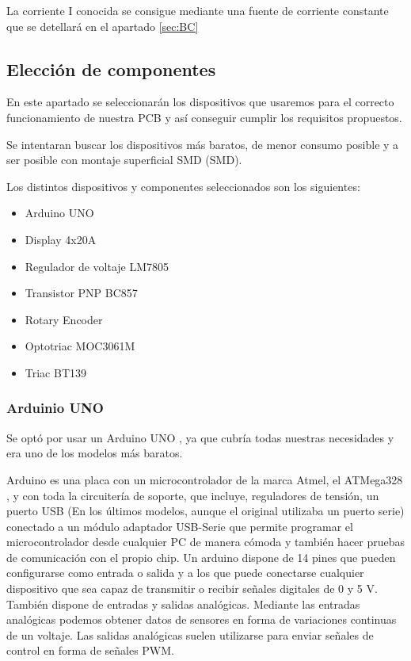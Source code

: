 La corriente I conocida se consigue mediante una fuente de corriente constante que se detellará en el apartado \ref{sec:BC}

\subsection{Elección de componentes}

En este apartado se seleccionarán los dispositivos que usaremos para el correcto funcionamiento de nuestra PCB y así conseguir cumplir los requisitos propuestos.

Se intentaran buscar los dispositivos más baratos, de menor consumo posible y a ser posible con montaje superficial \acrshort{SMD} (\acrlong{SMD}).

Los distintos dispositivos y componentes seleccionados son los siguientes:

\begin{itemize}
	\item Arduino UNO
	\item Display  4x20A 
	\item Regulador de voltaje LM7805
	\item Transistor PNP BC857
	\item Rotary Encoder 
	\item Optotriac MOC3061M
	\item Triac BT139
\end{itemize}

\subsubsection{Arduinio UNO}
Se optó por usar un Arduino UNO \cite{Arduino}, ya que cubría todas nuestras necesidades y era uno de los modelos más baratos. 

Arduino es una placa con un microcontrolador de la marca Atmel, el ATMega328 \cite{ATMega}, y con toda la circuitería de soporte, que incluye, reguladores de tensión, un puerto USB (En los últimos modelos, aunque el original utilizaba un puerto serie) conectado a un módulo adaptador USB-Serie que permite programar el microcontrolador desde cualquier PC de manera cómoda y también hacer pruebas de comunicación con el propio chip.
Un arduino dispone de 14 pines que pueden configurarse como entrada o salida y a los que puede conectarse cualquier dispositivo que sea capaz de transmitir o recibir señales digitales de 0 y 5 V.
También dispone de entradas y salidas analógicas. Mediante las entradas analógicas podemos obtener datos de sensores en forma de variaciones continuas de un voltaje. Las salidas analógicas suelen utilizarse para enviar señales de control en forma de señales \acrshort{PWM}.

